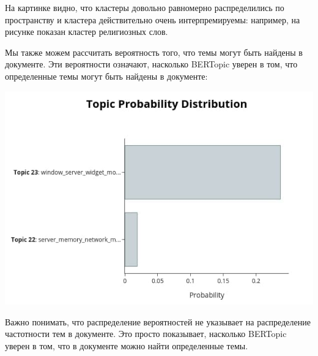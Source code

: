 На картинке видно, что кластеры довольно равномерно распределились по пространству и кластера действительно очень интерпремируемы: например, на рисунке показан кластер религиозных слов.


Мы также можем рассчитать вероятность того, что темы могут быть найдены в документе. Эти вероятности означают, насколько BERTopic уверен в том, что определенные темы могут быть найдены в документе:

\includegraphics[scale=0.9]{pics/bertopic-visual-2.jpg}

Важно понимать, что распределение вероятностей не указывает на распределение частотности тем в документе. Это просто показывает, насколько BERTopic уверен в том, что в документе можно найти определенные темы.
